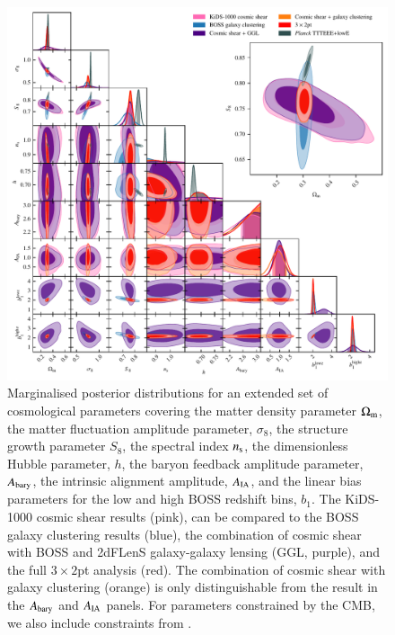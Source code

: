 \begin{figure}
	\begin{center}
		\includegraphics[width=\textwidth]{Parameter_Plots/cosmology/omegam_sigma8_s8_ns_h_a_baryon_a_ia_b1l_b1h_blind_C}
		\caption{Marginalised posterior distributions for an extended set of cosmological parameters covering the matter density parameter $\Omega_{\rm m}$, the matter fluctuation amplitude parameter, $\sigma_8$, the structure growth parameter $S_8$, the spectral index $n_{\rm s}$, the dimensionless Hubble parameter, $h$, the baryon feedback amplitude parameter, $A_{\rm bary}$, the intrinsic alignment amplitude, $A_{\rm IA}$, and the linear bias parameters for the low and high BOSS redshift bins, $b_1$.   The KiDS-1000 cosmic shear results (pink), can be compared to the BOSS galaxy clustering results (blue), the combination of cosmic shear with BOSS and 2dFLenS galaxy-galaxy lensing (GGL, purple), and the full $3\times2$pt analysis (red).  The combination of cosmic shear with galaxy clustering (orange) is only distinguishable from the \tttp result in the $A_{\rm bary}$ and $A_{\rm IA}$ panels.  For parameters constrained by the CMB, we also include constraints from \citet[][grey]{planck/etal:2018}.}
		\label{fig:cosmology-params-all}
	\end{center}
\end{figure}

